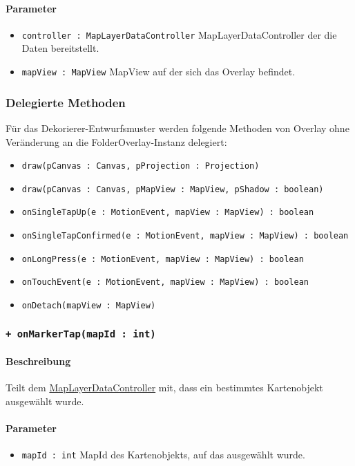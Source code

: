 \paragraph*{Parameter}
\begin{itemize}
    \item \texttt{controller : MapLayerDataController} MapLayerDataController der die Daten bereitstellt.
    \item \texttt{mapView : MapView} MapView auf der sich das Overlay befindet.
\end{itemize}

\subsubsection*{Delegierte Methoden}
Für das Dekorierer-Entwurfsmuster werden folgende Methoden von Overlay ohne Veränderung 
an die FolderOverlay-Instanz delegiert:
\begin{itemize}
    \item \texttt{draw(pCanvas : Canvas, pProjection : Projection)}
    \item \texttt{draw(pCanvas : Canvas, pMapView : MapView, pShadow : boolean)}
    \item \texttt{onSingleTapUp(e : MotionEvent, mapView : MapView) : boolean}
    \item \texttt{onSingleTapConfirmed(e : MotionEvent, mapView : MapView) : boolean}
    \item \texttt{onLongPress(e : MotionEvent, mapView : MapView) : boolean}
    \item \texttt{onTouchEvent(e : MotionEvent, mapView : MapView) : boolean}
    \item \texttt{onDetach(mapView : MapView)}
\end{itemize}

\subsubsection*{\texttt{+ onMarkerTap(mapId : int)}}%
\paragraph*{Beschreibung}
Teilt dem \hyperref[App_Map_ViewModel_MapLayerDataController]{MapLayerDataController} mit, dass ein bestimmtes Kartenobjekt ausgewählt wurde.
\paragraph*{Parameter}
\begin{itemize}
    \item \texttt{mapId : int} MapId des Kartenobjekts, auf das ausgewählt wurde.
\end{itemize}
